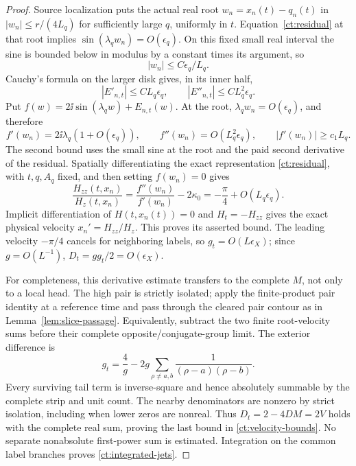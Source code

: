 \begin{proof}
Source localization puts the actual real root
$w_n=x_n(t)-q_n(t)$ in $|w_n|\le r/(4L_q)$ for sufficiently large
$q$, uniformly in $t$. Equation~\eqref{ct:residual} at that root
implies $\sin(\lambda_qw_n)=O(\epsilon_q)$. On this fixed small
real interval the sine is bounded below in modulus by a constant
times its argument, so
\begin{equation}
 |w_n|\le C\epsilon_q/L_q.
 \label{ct:sharpened-position}
\end{equation}
Cauchy's formula on the larger disk gives, in its inner half,
\[
 |E'_{n,t}|\le CL_q\epsilon_q,\qquad
 |E''_{n,t}|\le CL_q^2\epsilon_q.
\]
Put $f(w)=2\ii\sin(\lambda_qw)+E_{n,t}(w)$. At the root,
$\lambda_qw_n=O(\epsilon_q)$, and therefore
\begin{equation}
 f'(w_n)=2\ii\lambda_q(1+O(\epsilon_q)),\qquad
 f''(w_n)=O(L_q^2\epsilon_q),\qquad
 |f'(w_n)|\ge c_1L_q.
 \label{ct:root-jets}
\end{equation}
The second bound uses the small sine at the root and the paid
second derivative of the residual. Spatially differentiating the
exact representation \eqref{ct:residual}, with $t,q,A_q$ fixed,
and then setting $f(w_n)=0$ gives
\[
 \frac{H_{zz}(t,x_n)}{H_z(t,x_n)}
 =\frac{f''(w_n)}{f'(w_n)}-2\kappa_0
 =-\frac\pi4+O(L_q\epsilon_q).
\]
Implicit differentiation of $H(t,x_n(t))=0$ and $H_t=-H_{zz}$
gives the exact physical velocity $x_n'=H_{zz}/H_z$.
This proves its asserted bound. The leading velocity $-\pi/4$
cancels for neighboring labels, so $g_t=O(L\epsilon_X)$;
since $g=O(L^{-1})$, $D_t=gg_t/2=O(\epsilon_X)$.

For completeness, this derivative estimate transfers to the complete
$M$, not only to a local head. The high pair is strictly isolated;
apply the finite-product pair identity at a reference time and pass
through the cleared pair contour as in Lemma~\ref{lem:slice-passage}.
Equivalently, subtract the two finite root-velocity sums before their
complete opposite/conjugate-group limit. The exterior difference is
\[
 g_t=\frac4g-2g\sum_{\rho\ne a,b}
                       \frac1{(\rho-a)(\rho-b)}.
\]
Every surviving tail term is inverse-square and hence absolutely
summable by the complete strip and unit count. The nearby denominators
are nonzero by strict isolation, including when lower zeros are
nonreal. Thus $D_t=2-4DM=2V$ holds with the complete real sum,
proving the last bound in \eqref{ct:velocity-bounds}. No separate
nonabsolute first-power sum is estimated. Integration on the common
label branches proves \eqref{ct:integrated-jets}.
\end{proof}


